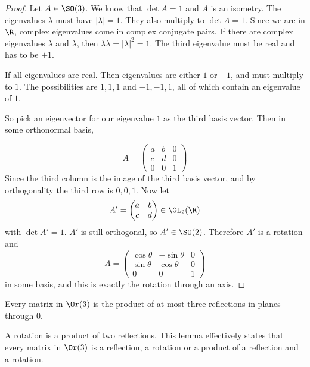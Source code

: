 \documentclass[a4paper]{article}
\begin{document}
  \begin{proof}
    Let $A\in \SO(3)$. We know that $\det A = 1$ and $A$ is an isometry. The eigenvalues $\lambda$ must have $|\lambda| = 1$. They also multiply to $\det A = 1$. Since we are in $\R$, complex eigenvalues come in complex conjugate pairs. If there are complex eigenvalues $\lambda$ and $\bar\lambda$, then $\lambda\bar\lambda = |\lambda|^2 = 1$. The third eigenvalue must be real and has to be $+1$.

    If all eigenvalues are real. Then eigenvalues are either $1$ or $-1$, and must multiply to $1$. The possibilities are $1, 1, 1$ and $-1, -1, 1$, all of which contain an eigenvalue of $1$.

    So pick an eigenvector for our eigenvalue $1$ as the third basis vector. Then in some orthonormal basis,

    \[
      A = \begin{pmatrix}
        a & b & 0\\
        c & d & 0\\
        0 & 0 & 1
      \end{pmatrix}
    \]
    Since the third column is the image of the third basis vector, and by orthogonality the third row is $0, 0, 1$. Now let
    \[A' = \begin{pmatrix}
        a & b\\
        c & d
      \end{pmatrix} \in \GL_2(\R)
    \]
    with $\det A' = 1$. $A'$ is still orthogonal, so $A'\in \SO(2)$. Therefore $A'$ is a rotation and
    \[
      A = 
      \begin{pmatrix}
        \cos\theta & -\sin\theta & 0\\
        \sin\theta & \cos\theta & 0\\
        0 & 0 & 1
      \end{pmatrix}
    \]
    in some basis, and this is exactly the rotation through an axis.
  \end{proof}

  \begin{lemma}
    Every matrix in $\Or(3)$ is the product of at most three reflections in planes through 0.
  \end{lemma}
  \note A rotation is a product of two reflections. This lemma effectively states that every matrix in $\Or(3)$ is a reflection, a rotation or a product of a reflection and a rotation.
\end{document}

